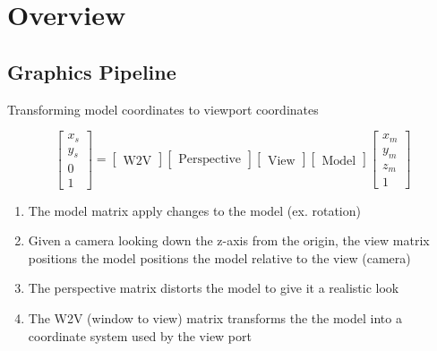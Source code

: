 \chapter{Overview}

\section{Graphics Pipeline}

  Transforming model coordinates to viewport coordinates

  \begin{equation}
    \begin{bmatrix}
      x_{s} \\
      y_{s} \\
      0 \\
      1
    \end{bmatrix}
    =
    \begin{bmatrix}
      \text{W2V}
    \end{bmatrix}
    \begin{bmatrix}
      \text{Perspective}
    \end{bmatrix}
    \begin{bmatrix}
      \text{View}
    \end{bmatrix}
    \begin{bmatrix}
      \text{Model}
    \end{bmatrix}
    \begin{bmatrix}
      x_{m} \\
      y_{m} \\
      z_{m} \\
      1
    \end{bmatrix}
  \end{equation}

  \begin{enumerate}
    \item The model matrix apply changes to the model (ex. rotation)
    \item Given a camera looking down the z-axis from the origin,
    the view matrix positions the model positions the model relative to the
    view (camera)
    \item The perspective matrix distorts the model to give it a realistic
    look
    \item The W2V (window to view) matrix transforms the the model into a
    coordinate system used by the view port
  \end{enumerate}
